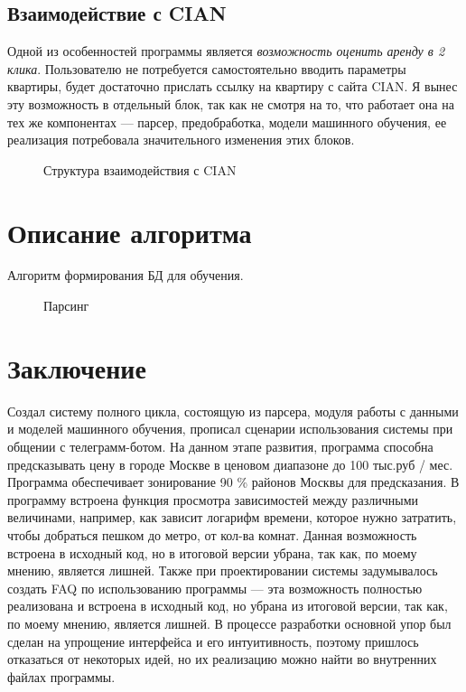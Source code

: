 \documentclass{article}
\begin{document}
		\subsection{Взаимодействие с CIAN}
		
			Одной из особенностей программы является \textit{возможность оценить аренду в 2 клика}. Пользователю не потребуется самостоятельно вводить параметры квартиры, будет достаточно прислать ссылку на квартиру с сайта CIAN. Я вынес эту возможность в отдельный блок, так как не смотря на то, что работает она на тех же компонентах --- парсер, предобработка, модели машинного обучения, ее реализация потребовала значительного изменения этих блоков.
			
			\begin{figure}[H]
				\centering
				\caption{Структура взаимодействия с CIAN}
				\label{fig:cian}
			\end{figure}
	
	\newpage
	\section{Описание алгоритма}	
		
		Алгоритм формирования БД для обучения.
		
		\begin{figure}[H]
			\centering
			\caption{Парсинг}
			\label{fig:algorithm_parsing}
		\end{figure}
	
	\newpage
	\section{Заключение}
		Создал систему полного цикла, состоящую из парсера, модуля работы с данными и моделей машинного обучения, прописал сценарии использования системы при общении с телеграмм-ботом. На данном этапе развития, программа способна предсказывать цену в городе Москве в ценовом диапазоне до 100 тыс.руб / мес. Программа обеспечивает зонирование 90 \% районов Москвы для предсказания. В программу встроена функция просмотра зависимостей между различными величинами, например, как зависит логарифм времени, которое нужно затратить, чтобы добраться пешком до метро, от кол-ва комнат. Данная возможность встроена в исходный код, но в итоговой версии убрана, так как, по моему мнению, является лишней. Также при проектировании системы задумывалось создать FAQ по использованию программы --- эта возможность полностью реализована и встроена в исходный код, но убрана из итоговой версии, так как, по моему мнению, является лишней. В процессе разработки основной упор был сделан на упрощение интерфейса и его интуитивность, поэтому пришлось отказаться от некоторых идей, но их реализацию можно найти во внутренних файлах программы.
		
\end{document}
